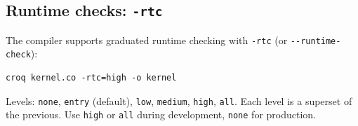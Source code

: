 \subsection*{Runtime checks: \texttt{-rtc}}

The compiler supports graduated runtime checking with \texttt{-rtc} (or \texttt{-\allowbreak{}-\allowbreak{}runtime-\allowbreak{}check}):

\begin{lstlisting}[language={},caption={Runtime checks: -rtc}]
croq kernel.co -rtc=high -o kernel
\end{lstlisting}

Levels: \texttt{none}, \texttt{entry} (default), \texttt{low}, \texttt{medium}, \texttt{high}, \texttt{all}. Each level is a superset of the previous. Use \texttt{high} or \texttt{all} during development, \texttt{none} for production.

